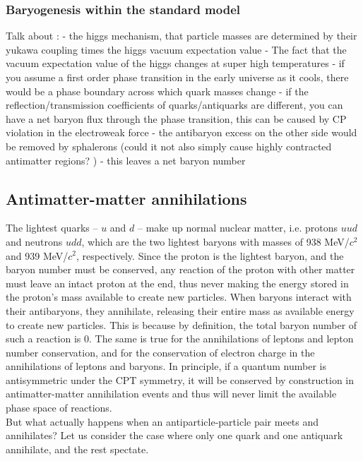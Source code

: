 \subsubsection{Baryogenesis within the standard model}
Talk about :
 - the higgs mechanism, that particle masses are determined by their yukawa coupling times the higgs vacuum expectation value
 - The fact that the vacuum expectation value of the higgs changes at super high temperatures
 - if you assume a first order phase transition in the early universe as it cools, there would be a phase boundary across which quark masses change
 - if the reflection/transmission coefficients of quarks/antiquarks are different, you can have a net baryon flux through the phase transition, this can be caused by CP violation in the electroweak force
 - the antibaryon excess on the other side would be removed by sphalerons (could it not also simply cause highly contracted antimatter regions? )
 - this leaves a net baryon number

\subsection{Antimatter-matter annihilations}
The lightest quarks -- $u$ and $d$ -- make up normal nuclear matter, i.e. protons $uud$ and neutrons $udd$, which are the two lightest baryons with masses of 938 MeV/$c^2$ and 939 MeV/$c^2$, respectively. Since the proton is the lightest baryon, and the baryon number must be conserved, any reaction of the proton with other matter must leave an intact proton at the end, thus never making the energy stored in the proton's mass available to create new particles. When baryons interact with their antibaryons, they annihilate, releasing their entire mass as available energy to create new particles. This is because by definition, the total baryon number of such a reaction is 0. The same is true for the annihilations of leptons and lepton number conservation, and for the conservation of electron charge in the annihilations of leptons and baryons. In principle, if a quantum number is antisymmetric under the CPT symmetry, it will be conserved by construction in antimatter-matter annihilation events and thus will never limit the available phase space of reactions. \\

But what actually happens when an antiparticle-particle pair meets and annihilates? Let us consider the case where only one quark and one antiquark annihilate, and the rest spectate. 

